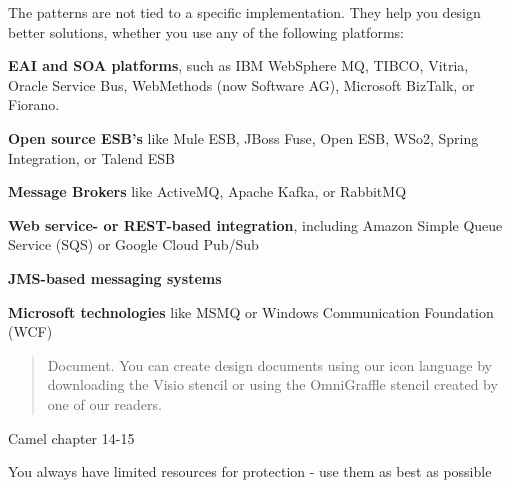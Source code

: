 \documentclass[Screen16to9,17pt]{foils}
\begin{document}




The patterns are not tied to a specific implementation. They help you design better solutions, whether you use any of the following platforms:
\begin{list2}
  \item {\bf EAI and SOA platforms}, such as IBM WebSphere MQ, TIBCO, Vitria, Oracle Service Bus, WebMethods (now Software AG), Microsoft BizTalk, or Fiorano.
\item {\bf Open source ESB's} like Mule ESB, JBoss Fuse, Open ESB, WSo2, Spring Integration, or Talend ESB
\item {\bf Message Brokers} like ActiveMQ, Apache Kafka, or RabbitMQ
\item {\bf Web service- or REST-based integration}, including Amazon Simple Queue Service (SQS) or Google Cloud Pub/Sub
\item {\bf JMS-based messaging systems}
\item {\bf Microsoft technologies} like MSMQ or Windows Communication Foundation (WCF)
\end{list2}



\begin{quote}
Document. You can create design documents using our icon language by downloading the Visio stencil or using the OmniGraffle stencil created by one of our readers.
\end{quote}

\begin{list2}
\item {}
\item {}
\end{list2}


Camel chapter 14-15



\begin{list1}
\item You always have limited resources for protection - use them as best as possible
\end{list1}
\end{document}
